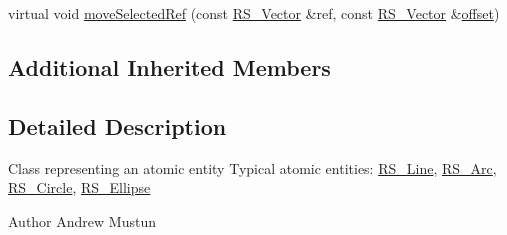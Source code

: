\begin{DoxyCompactItemize}
\item 
virtual void \hyperlink{classRS__AtomicEntity_ae25b3ef890c15bc0fcd8a9fa4308bdbc}{move\-Selected\-Ref} (const \hyperlink{classRS__Vector}{R\-S\-\_\-\-Vector} \&ref, const \hyperlink{classRS__Vector}{R\-S\-\_\-\-Vector} \&\hyperlink{classRS__AtomicEntity_ab708a0d05c11fd7eff646243db60464a}{offset})
\end{DoxyCompactItemize}
\subsection*{Additional Inherited Members}


\subsection{Detailed Description}
Class representing an atomic entity Typical atomic entities\-: \hyperlink{classRS__Line}{R\-S\-\_\-\-Line}, \hyperlink{classRS__Arc}{R\-S\-\_\-\-Arc}, \hyperlink{classRS__Circle}{R\-S\-\_\-\-Circle}, \hyperlink{classRS__Ellipse}{R\-S\-\_\-\-Ellipse}

\begin{DoxyAuthor}{Author}
Andrew Mustun 
\end{DoxyAuthor}


